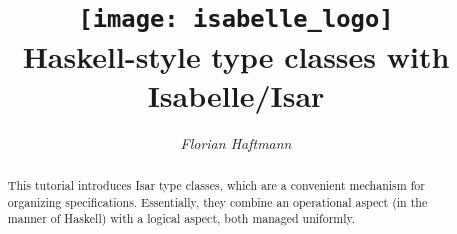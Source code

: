 \documentclass[12pt,a4paper,fleqn]{article}
\title{\texttt{[image: isabelle\_logo]}
  \\[4ex] Haskell-style type classes with Isabelle/Isar}
\author{\emph{Florian Haftmann}}
\begin{document}
\maketitle

\begin{abstract}
  \noindent This tutorial introduces Isar type classes, which 
  are a convenient mechanism for organizing specifications.
  Essentially, they combine an operational aspect (in the
  manner of Haskell) with a logical aspect, both managed uniformly.
\end{abstract}

\thispagestyle{empty}\clearpage

\clearfirst



\begingroup
 \small\raggedright\frenchspacing

\endgroup
\end{document}
